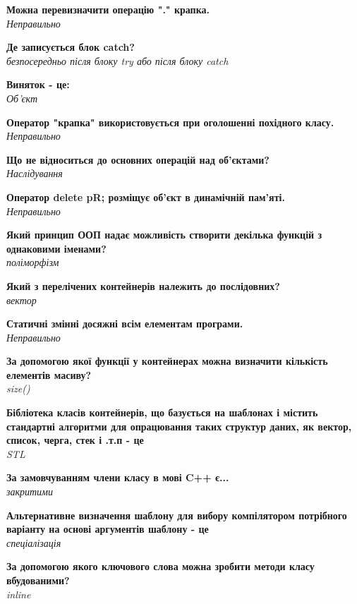 \documentclass{article}
\begin{document}
\begin{list}{}{}
	\item \textbf{Можна перевизначити операцію "." крапка.} \\ \textit{Неправильно}
	\item \textbf{Де записується блок catch?} \\ \textit{безпосередньо після блоку try або після блоку catch}
	\item \textbf{Виняток - це:} \\ \textit{Об'єкт}
	\item \textbf{Оператор "крапка" використовується при оголошенні похідного класу.} \\ \textit{Неправильно}
	\item \textbf{Що не відноситься до основних операцій над об'єктами?} \\ \textit{Наслідування}
	\item \textbf{Оператор delete pR; розміщує об'єкт в динамічній пам'яті.} \\ \textit{Неправильно}
	\item \textbf{Який принцип ООП надає можливість створити декілька функцій з однаковими іменами?} \\ \textit{поліморфізм}
	\item \textbf{Який з перелічених контейнерів належить до послідовних?} \\ \textit{вектор}
	\item \textbf{Статичні змінні досяжні всім елементам програми.} \\ \textit{Неправильно}
	\item \textbf{За допомогою якої функції у контейнерах можна визначити кількість елементів масиву?} \\ \textit{size()}
	\item \textbf{Бібліотека класів контейнерів, що базується на шаблонах і містить стандартні алгоритми для опрацювання таких структур даних, як вектор, список, черга, стек і .т.п - це} \\ \textit{STL}
	\item \textbf{За замовчуванням члени класу в мові C++ є...} \\ \textit{закритими}
	\item \textbf{Альтернативне визначення шаблону для вибору компілятором потрібного варіанту на основі аргументів шаблону - це} \\ \textit{спеціалізація}
	\item \textbf{За допомогою якого ключового слова можна зробити методи класу вбудованими?} \\ \textit{inline}

\end{list}
\end{document}
